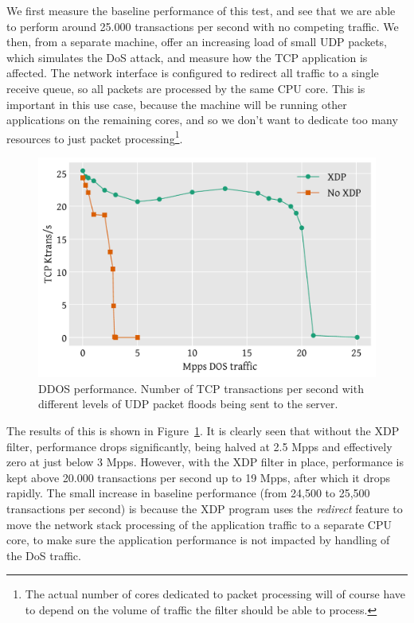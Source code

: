 \documentclass[10pt,sigconf]{acmart}
\begin{document}
We first measure the baseline performance of this test, and see that we are able
to perform around 25.000 transactions per second with no competing traffic. We
then, from a separate machine, offer an increasing load of small UDP packets,
which simulates the DoS attack, and measure how the TCP application is affected.
The network interface is configured to redirect all traffic to a single receive
queue, so all packets are processed by the same CPU core. This is important in
this use case, because the machine will be running other applications on the
remaining cores, and so we don't want to dedicate too many resources to just
packet processing\footnote{The actual number of cores dedicated to packet
  processing will of course have to depend on the volume of traffic the filter
  should be able to process.}.

\begin{figure}[t]
\centering
\includegraphics[width=\linewidth]{figures/ddos-test.pdf}
\caption{\label{fig:ddos-results} DDOS performance. Number of TCP transactions
  per second with different levels of UDP packet floods being sent to the
  server.}
\end{figure}

The results of this is shown in Figure~\ref{fig:ddos-results}. It is clearly
seen that without the XDP filter, performance drops significantly, being halved
at 2.5 Mpps and effectively zero at just below 3 Mpps. However, with the XDP
filter in place, performance is kept above 20.000 transactions per second up to
19 Mpps, after which it drops rapidly. The small increase in baseline
performance (from 24,500 to 25,500 transactions per second) is because the XDP
program uses the \emph{redirect} feature to move the network stack processing of
the application traffic to a separate CPU core, to make sure the application
performance is not impacted by handling of the DoS traffic.
\end{document}

